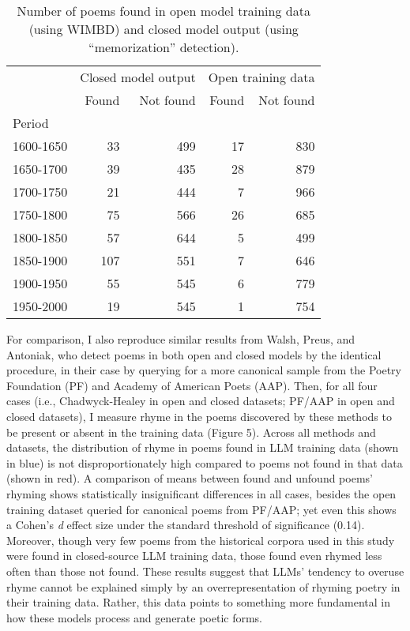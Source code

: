 \documentclass{simple-humanities}         %
\begin{document}
\begin{table}[H]
  \centering
  \small
  \singlespacing
  \begin{tabular}{lrrrr}
    \toprule
     & \multicolumn{2}{r}{Closed model output} & \multicolumn{2}{r}{Open training data} \\
    & Found & Not found & Found & Not found \\
    Period &  &  &  &  \\
    \midrule
    1600-1650 & 33 & 499 & 17 & 830 \\
    1650-1700 & 39 & 435 & 28 & 879 \\
    1700-1750 & 21 & 444 & 7 & 966 \\
    1750-1800 & 75 & 566 & 26 & 685 \\
    1800-1850 & 57 & 644 & 5 & 499 \\
    1850-1900 & 107 & 551 & 7 & 646 \\
    1900-1950 & 55 & 545 & 6 & 779 \\
    1950-2000 & 19 & 545 & 1 & 754 \\
    \bottomrule
    \end{tabular}    
  \caption{Number of poems found in open model training data (using WIMBD) and closed model output (using ``memorization'' detection).}
  \label{tab:num_poems_found_not_found}
  \end{table}

For comparison, I also reproduce similar results from Walsh, Preus, and Antoniak, who detect poems in both open and closed models by the identical procedure, in their case by querying for a more canonical sample from the Poetry Foundation (PF) and Academy of American Poets (AAP).
Then, for all four cases (i.e., Chadwyck-Healey in open and closed datasets; PF/AAP in open and closed datasets), I measure rhyme in the poems discovered by these methods to be present or absent in the training data (Figure 5).
Across all methods and datasets, the distribution of rhyme in poems found in LLM training data (shown in blue) is not disproportionately high compared to poems not found in that data (shown in red).
A comparison of means between found and unfound poems' rhyming shows statistically insignificant differences in all cases, besides the open training dataset queried for canonical poems from PF/AAP; yet even this shows a Cohen's \emph{d} effect size under the standard threshold of significance (0.14).
Moreover, though very few poems from the historical corpora used in this study were found in closed-source LLM training data, those found even rhymed less often than those not found.
These results suggest that LLMs' tendency to overuse rhyme cannot be explained simply by an overrepresentation of rhyming poetry in their training data.
Rather, this data points to something more fundamental in how these models process and generate poetic forms.
\end{document}
